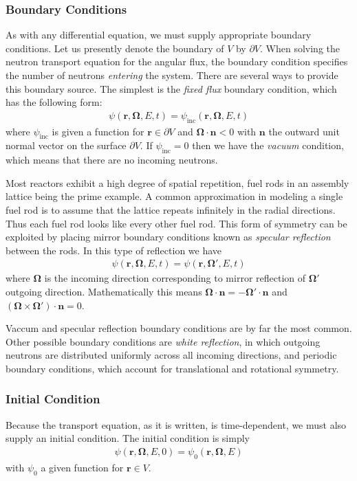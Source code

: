 \documentclass[11pt]{article}
\renewcommand\vec{\mathbf}
\begin{document}
\subsubsection{Boundary Conditions}
\label{sec:orgheadline48}
As with any differential equation, we must supply appropriate boundary conditions.  Let us presently denote the boundary of \(V\) by \(\partial V\).  When solving the neutron transport equation for the angular flux, the boundary condition specifies the number of neutrons \emph{entering} the system.  There are several ways to provide this boundary source.  The simplest is the \emph{fixed flux} boundary condition, which has the following form:
\begin{align}
  \psi(\vec{r},\vec{\Omega},E,t) = \psi_\text{inc}(\vec{r},\vec{\Omega},E,t)
\end{align}
where \(\psi_\text{inc}\) is given a function for \(\vec{r} \in \partial V\) and \(\vec{\Omega} \cdot \vec{n} < 0\) with \(\vec{n}\) the outward unit normal vector on the surface \(\partial V\).  If \(\psi_\text{inc} = 0\) then we have the \emph{vacuum} condition, which means that there are no incoming neutrons.

Most reactors exhibit a high degree of spatial repetition, fuel rods in an assembly lattice being the prime example.  A common approximation in modeling a single fuel rod is to assume that the lattice repeats infinitely in the radial directions.  Thus each fuel rod looks like every other fuel rod.  This form of symmetry can be exploited by placing mirror boundary conditions known as \emph{specular reflection} between the rods.  In this type of reflection we have
\begin{align}
  \psi(\vec{r},\vec{\Omega},E,t) = \psi(\vec{r},\vec{\Omega}',E,t)
\end{align}
where \(\vec{\Omega}\) is the incoming direction corresponding to mirror reflection of \(\vec{\Omega}'\) outgoing direction.  Mathematically this means \(\vec{\Omega} \cdot \vec{n} = - \vec{\Omega}' \cdot \vec{n}\) and \(\left(\vec{\Omega} \times \vec{\Omega}'\right) \cdot \vec{n} = 0\).

Vaccum and specular reflection boundary conditions are by far the most common.  Other possible boundary conditions are \emph{white reflection}, in which outgoing neutrons are distributed uniformly across all incoming directions, and periodic boundary conditions, which account for translational and rotational symmetry.

\subsubsection{Initial Condition}
\label{sec:orgheadline49}
Because the transport equation, as it is written, is time-dependent, we must also supply an initial condition.  The initial condition is simply
\begin{align}
  \psi(\vec{r},\vec{\Omega},E,0) = \psi_0(\vec{r},\vec{\Omega},E)
\end{align}
with \(\psi_0\) a given function for \(\vec{r} \in V\).
\end{document}
